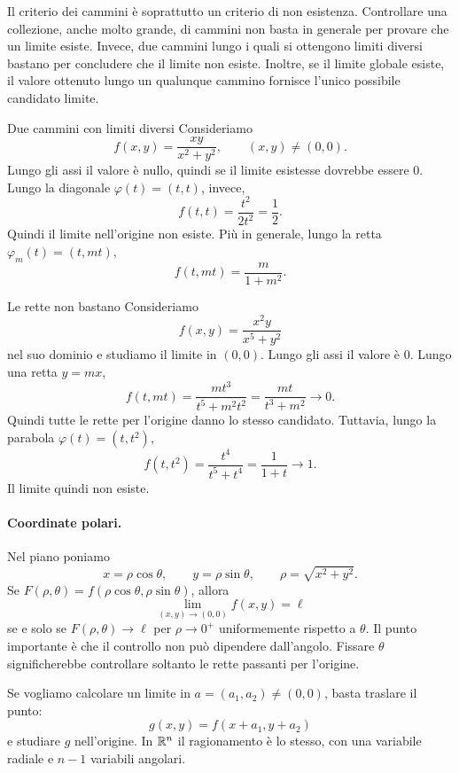 \documentclass[a4paper]{article}
\begin{document}
\begin{radioactive}
Il criterio dei cammini è soprattutto un criterio di non esistenza. Controllare una collezione,
anche molto grande, di cammini non basta in generale per provare che un limite esiste.
Invece, due cammini lungo i quali si ottengono limiti diversi bastano per concludere che il limite
non esiste. Inoltre, se il limite globale esiste, il valore ottenuto lungo un qualunque cammino
fornisce l'unico possibile candidato limite.

\begin{snippetexample}{Due cammini con limiti diversi}
    Consideriamo
    \[
        f(x,y)=\frac{xy}{x^2+y^2},
        \qquad (x,y)\neq(0,0).
    \]
    Lungo gli assi il valore è nullo, quindi se il limite esistesse dovrebbe essere \(0\).
    Lungo la diagonale \(\varphi(t)=(t,t)\), invece,
    \[
        f(t,t)=\frac{t^2}{2t^2}=\frac12.
    \]
    Quindi il limite nell'origine non esiste. Più in generale, lungo la retta
    \(\varphi_m(t)=(t,mt)\),
    \[
        f(t,mt)=\frac{m}{1+m^2}.
    \]
\end{snippetexample}

\begin{snippetexample}{Le rette non bastano}
    Consideriamo
    \[
        f(x,y)=\frac{x^2y}{x^5+y^2}
    \]
    nel suo dominio e studiamo il limite in \((0,0)\). Lungo gli assi il valore è \(0\).
    Lungo una retta \(y=mx\),
    \[
        f(t,mt)=\frac{mt^3}{t^5+m^2t^2}
        =\frac{mt}{t^3+m^2}\to0.
    \]
    Quindi tutte le rette per l'origine danno lo stesso candidato. Tuttavia, lungo la parabola
    \(\varphi(t)=(t,t^2)\),
    \[
        f(t,t^2)=\frac{t^4}{t^5+t^4}=\frac{1}{1+t}\to1.
    \]
    Il limite quindi non esiste.
\end{snippetexample}

\paragraph{Coordinate polari.}
Nel piano poniamo
\[
    x=\rho\cos\theta,
    \qquad
    y=\rho\sin\theta,
    \qquad
    \rho=\sqrt{x^2+y^2}.
\]
Se \(F(\rho,\theta)=f(\rho\cos\theta,\rho\sin\theta)\), allora
\[
    \lim_{(x,y)\to(0,0)}f(x,y)=\ell
\]
se e solo se \(F(\rho,\theta)\to\ell\) per \(\rho\to0^+\) uniformemente rispetto a \(\theta\).
Il punto importante è che il controllo non può dipendere dall'angolo. Fissare \(\theta\)
significherebbe controllare soltanto le rette passanti per l'origine.

Se vogliamo calcolare un limite in \(a=(a_1,a_2)\neq(0,0)\), basta traslare il punto:
\[
    g(x,y)=f(x+a_1,y+a_2)
\]
e studiare \(g\) nell'origine. In \(\mathbb{R}^n\) il ragionamento è lo stesso,
con una variabile radiale e \(n-1\) variabili angolari.


\end{radioactive}
\end{document}

